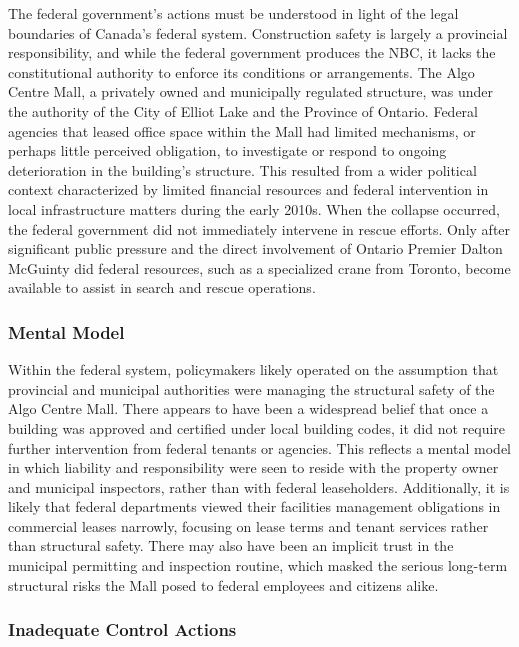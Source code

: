 \documentclass[12pt]{article}
\begin{document}
The federal government's actions must be understood in light of the legal boundaries of Canada's federal system. Construction safety is largely a provincial responsibility, and while the federal government produces the NBC, it lacks the constitutional authority to enforce its conditions or arrangements. The Algo Centre Mall, a privately owned and municipally regulated structure, was under the authority of the City of Elliot Lake and the Province of Ontario. Federal agencies that leased office space within the Mall had limited mechanisms, or perhaps little perceived obligation, to investigate or respond to ongoing deterioration in the building's structure. This resulted from a wider political context characterized by limited financial resources and federal intervention in local infrastructure matters during the early 2010s. When the collapse occurred, the federal government did not immediately intervene in rescue efforts. Only after significant public pressure and the direct involvement of Ontario Premier Dalton McGuinty did federal resources, such as a specialized crane from Toronto, become available to assist in search and rescue operations.

\subsubsection*{Mental Model}

Within the federal system, policymakers likely operated on the assumption that provincial and municipal authorities were managing the structural safety of the Algo Centre Mall. There appears to have been a widespread belief that once a building was approved and certified under local building codes, it did not require further intervention from federal tenants or agencies. This reflects a mental model in which liability and responsibility were seen to reside with the property owner and municipal inspectors, rather than with federal leaseholders. Additionally, it is likely that federal departments viewed their facilities management obligations in commercial leases narrowly, focusing on lease terms and tenant services rather than structural safety. There may also have been an implicit trust in the municipal permitting and inspection routine, which masked the serious long-term structural risks the Mall posed to federal employees and citizens alike.

\subsubsection*{Inadequate Control Actions}
\end{document}
